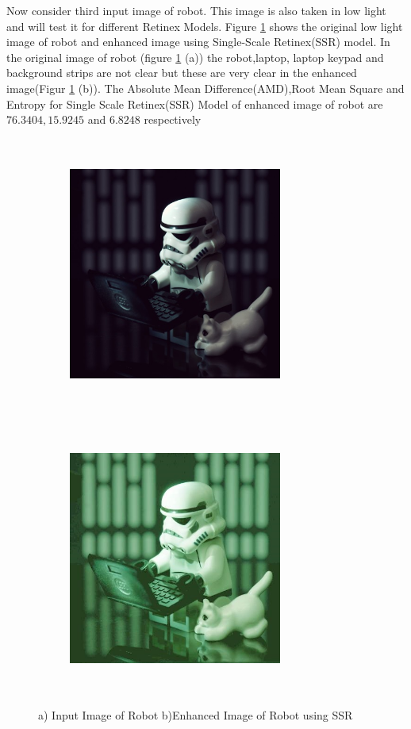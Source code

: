 Now consider third input image of robot. This image is also taken in low light and will test it for different Retinex Models. Figure \ref{fig:ssrRobot} shows the original low light image of robot and enhanced image using Single-Scale Retinex(SSR) model. In the original image of robot (figure \ref{fig:ssrRobot} (a))  the robot,laptop, laptop keypad and background strips are not clear but these are very clear in the enhanced image(Figur \ref{fig:ssrRobot} (b)). The Absolute Mean Difference(AMD),Root Mean Square and Entropy for Single Scale Retinex(SSR) Model of enhanced image of robot are $76.3404, 15.9245$ and $6.8248$ respectively      


\begin{figure}[!htb]
	\begin{subfigure}{8cm}
		\centering    
    	\includegraphics[width=7cm,height=9cm,keepaspectratio]{images/ch5/robot_input.jpg}
    	\caption{} 
    \end{subfigure}
  	\begin{subfigure}{6cm}
  		\centering
  		\includegraphics[width=7cm,height=9cm,keepaspectratio]{images/ch5/robot_ssr.jpg}
   		\caption{}
  	\end{subfigure}
  	\caption{a) Input Image of Robot b)Enhanced Image of Robot using SSR}
  	\label{fig:ssrRobot}
\end{figure}



